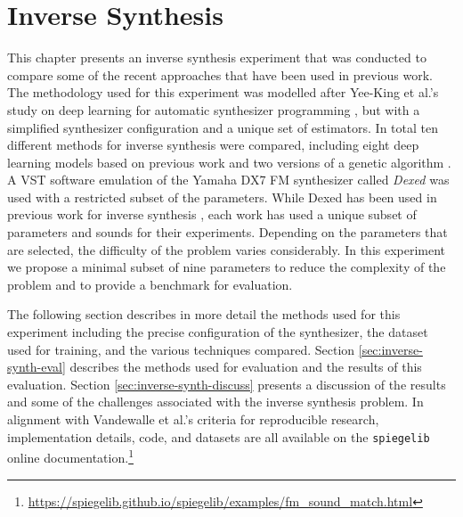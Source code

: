 \chapter{Inverse Synthesis}
\label{chapter:inverse_synth_experiment}
This chapter presents an inverse synthesis experiment that was conducted to compare some of the recent approaches that have been used in previous work. The methodology used for this experiment was modelled after Yee-King et al.'s study on deep learning for automatic synthesizer programming \cite{yee2018automatic}, but with a simplified synthesizer configuration and a unique set of estimators. In total ten different methods for inverse synthesis were compared, including eight deep learning models based on previous work \cite{barkan2019inversynth, yee2018automatic} and two versions of a genetic algorithm \cite{horner1993machine, tatar2016automatic}. A VST software emulation of the Yamaha DX7 FM synthesizer called \textit{Dexed} was used with a restricted subset of the parameters. While Dexed has been used in previous work for inverse synthesis \cite{yee2018automatic, luke2019stochastic, le2021improving, masudo2021quality}, each work has used a unique subset of parameters and sounds for their experiments. Depending on the parameters that are selected, the difficulty of the problem varies considerably. In this experiment we propose a minimal subset of nine parameters to reduce the complexity of the problem and to provide a benchmark for evaluation.

The following section describes in more detail the methods used for this experiment including the precise configuration of the synthesizer, the dataset used for training, and the various techniques compared. Section \ref{sec:inverse-synth-eval} describes the methods used for evaluation and the results of this evaluation. Section \ref{sec:inverse-synth-discuss} presents a discussion of the results and some of the challenges associated with the inverse synthesis problem. In alignment with Vandewalle et al.'s criteria for reproducible research, implementation details, code, and datasets are all available on the \texttt{spiegelib} online documentation.\footnote{\url{https://spiegelib.github.io/spiegelib/examples/fm_sound_match.html}}


